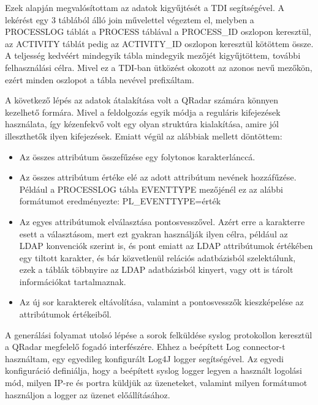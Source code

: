 Ezek alapján megvalósítottam az adatok kigyűjtését a TDI segítségével. A lekérést egy 3 táblából álló join művelettel végeztem el, melyben a PROCESSLOG táblát a PROCESS táblával a PROCESS\_ID oszlopon keresztül, az ACTIVITY táblát pedig az ACTIVITY\_ID oszlopon keresztül kötöttem össze. A teljesség kedvéért mindegyik tábla mindegyik mezőjét kigyűjtöttem, további felhasználási célra. Mivel ez a TDI-ban ütközést okozott az azonos nevű mezőkön, ezért minden oszlopot a tábla nevével prefixáltam.

A következő lépés az adatok átalakítása volt a QRadar számára könnyen kezelhető formára. Mivel a feldolgozás egyik módja a reguláris kifejezések használata, így kézenfekvő volt egy olyan struktúra kialakítása, amire jól illeszthetők ilyen kifejezések. Emiatt végül az alábbiak mellett döntöttem:

\begin{itemize}
	\item Az összes attribútum összefűzése egy folytonos karakterlánccá.
	
	\item Az összes attribútum értéke elé az adott attribútum nevének hozzáfűzése. Például a PROCESSLOG tábla EVENTTYPE mezőjénél ez az alábbi formátumot eredményezte: PL\_EVENTTYPE={érték}
	
	\item Az egyes attribútumok elválasztása pontosvesszővel. Azért erre a karakterre esett a választásom, mert ezt gyakran használják ilyen célra, például az LDAP konvenciók szerint is, és pont emiatt az LDAP attribútumok értékében egy tiltott karakter, és bár közvetlenül relációs adatbázisból szelektálunk, ezek a táblák többnyire az LDAP adatbázisból kinyert, vagy ott is tárolt információkat tartalmaznak.
	
	\item Az új sor karakterek eltávolítása, valamint a pontosvesszők \todo kieszképelése az attribútumok értékeiből.
\end{itemize} 




A generálási folyamat utolsó lépése a sorok felküldése syslog protokollon keresztül a QRadar megfelelő fogadó interfészére. Ehhez a beépített Log connector-t használtam, egy egyedileg konfigurált Log4J logger segítségével. Az egyedi konfiguráció definiálja, hogy a beépített syslog logger legyen a használt logolási mód, milyen IP-re és portra küldjük az üzeneteket, valamint milyen formátumot használjon a logger az üzenet előállításához.


